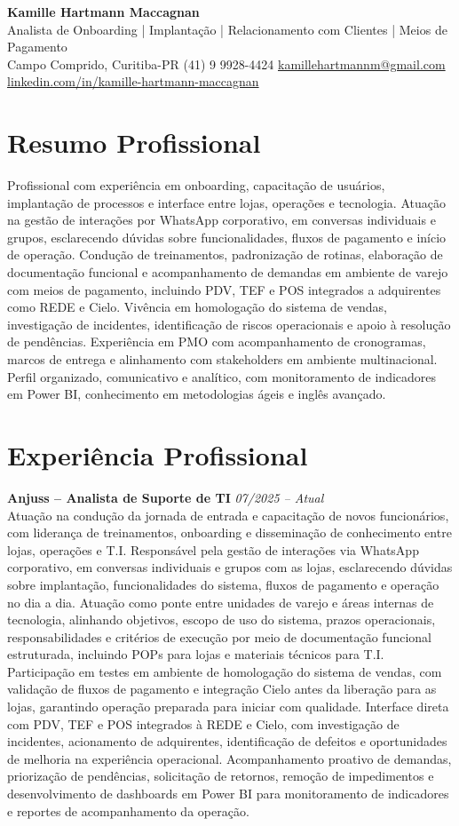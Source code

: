 \documentclass[11pt,a4paper]{article}
\newcommand{\cvheader}[4]{%
  \begin{center}
    {\LARGE\bfseries #1}\\[4pt]
    {\large #2}\\[6pt]
    #3\\[2pt]
    #4
  \end{center}
  \vspace{4pt}
}
\newcommand{\experience}[3]{%
  \textbf{#1} \hfill \textit{#2}\\[4pt]
  #3
  \vspace{8pt}
}
\begin{document}
\cvheader{Kamille Hartmann Maccagnan}%
{Analista de Onboarding | Implantação | Relacionamento com Clientes | Meios de Pagamento}%
{Campo Comprido, Curitiba-PR \textbullet{} (41) 9 9928-4424 \textbullet{} \href{mailto:kamillehartmannm@gmail.com}{kamillehartmannm@gmail.com}}%
{\href{https://linkedin.com/in/kamille-hartmann-maccagnan/}{linkedin.com/in/kamille-hartmann-maccagnan}}

\section*{Resumo Profissional}

Profissional com experiência em onboarding, capacitação de usuários, implantação de processos e interface entre lojas, operações e tecnologia. Atuação na gestão de interações por WhatsApp corporativo, em conversas individuais e grupos, esclarecendo dúvidas sobre funcionalidades, fluxos de pagamento e início de operação. Condução de treinamentos, padronização de rotinas, elaboração de documentação funcional e acompanhamento de demandas em ambiente de varejo com meios de pagamento, incluindo PDV, TEF e POS integrados a adquirentes como REDE e Cielo. Vivência em homologação do sistema de vendas, investigação de incidentes, identificação de riscos operacionais e apoio à resolução de pendências. Experiência em PMO com acompanhamento de cronogramas, marcos de entrega e alinhamento com stakeholders em ambiente multinacional. Perfil organizado, comunicativo e analítico, com monitoramento de indicadores em Power BI, conhecimento em metodologias ágeis e inglês avançado.

\section*{Experiência Profissional}

\experience{Anjuss -- Analista de Suporte de TI}{07/2025 -- Atual}{%
Atuação na condução da jornada de entrada e capacitação de novos funcionários, com liderança de treinamentos, onboarding e disseminação de conhecimento entre lojas, operações e T.I. Responsável pela gestão de interações via WhatsApp corporativo, em conversas individuais e grupos com as lojas, esclarecendo dúvidas sobre implantação, funcionalidades do sistema, fluxos de pagamento e operação no dia a dia. Atuação como ponte entre unidades de varejo e áreas internas de tecnologia, alinhando objetivos, escopo de uso do sistema, prazos operacionais, responsabilidades e critérios de execução por meio de documentação funcional estruturada, incluindo POPs para lojas e materiais técnicos para T.I. Participação em testes em ambiente de homologação do sistema de vendas, com validação de fluxos de pagamento e integração Cielo antes da liberação para as lojas, garantindo operação preparada para iniciar com qualidade. Interface direta com PDV, TEF e POS integrados à REDE e Cielo, com investigação de incidentes, acionamento de adquirentes, identificação de defeitos e oportunidades de melhoria na experiência operacional. Acompanhamento proativo de demandas, priorização de pendências, solicitação de retornos, remoção de impedimentos e desenvolvimento de dashboards em Power BI para monitoramento de indicadores e reportes de acompanhamento da operação.}
\end{document}
